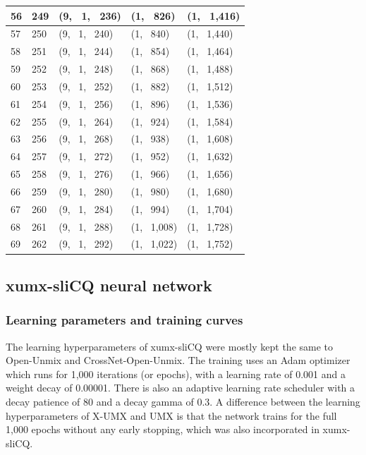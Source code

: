 \documentclass[report.tex]{subfiles}
\begin{document}
\begin{table}[ht]
\begin{tabular}{ |l|l|l|l|l| }
\hline
56 & 249 & (9, \ 1, \ 236) & (1, \ 826) & (1, \ 1,416) \\
\hline
57 & 250 & (9, \ 1, \ 240) & (1, \ 840) & (1, \ 1,440) \\
\hline
58 & 251 & (9, \ 1, \ 244) & (1, \ 854) & (1, \ 1,464) \\
\hline
59 & 252 & (9, \ 1, \ 248) & (1, \ 868) & (1, \ 1,488) \\
\hline
60 & 253 & (9, \ 1, \ 252) & (1, \ 882) & (1, \ 1,512) \\
\hline
61 & 254 & (9, \ 1, \ 256) & (1, \ 896) & (1, \ 1,536) \\
\hline
62 & 255 & (9, \ 1, \ 264) & (1, \ 924) & (1, \ 1,584) \\
\hline
63 & 256 & (9, \ 1, \ 268) & (1, \ 938) & (1, \ 1,608) \\
\hline
64 & 257 & (9, \ 1, \ 272) & (1, \ 952) & (1, \ 1,632) \\
\hline
65 & 258 & (9, \ 1, \ 276) & (1, \ 966) & (1, \ 1,656) \\
\hline
66 & 259 & (9, \ 1, \ 280) & (1, \ 980) & (1, \ 1,680) \\
\hline
67 & 260 & (9, \ 1, \ 284) & (1, \ 994) & (1, \ 1,704) \\
\hline
68 & 261 & (9, \ 1, \ 288) & (1, \ 1,008) & (1, \ 1,728) \\
\hline
69 & 262 & (9, \ 1, \ 292) & (1, \ 1,022) & (1, \ 1,752) \\
\hline
\end{tabular}
\end{table}

\newpagefill

\subsection{xumx-sliCQ neural network}

\subsubsection{Learning parameters and training curves}

The learning hyperparameters of xumx-sliCQ were mostly kept the same to Open-Unmix and CrossNet-Open-Unmix. The training uses an Adam optimizer which runs for 1,000 iterations (or epochs), with a learning rate of 0.001 and a weight decay of 0.00001. There is also an adaptive learning rate scheduler with a decay patience of 80 and a decay gamma of 0.3. A difference between the learning hyperparameters of X-UMX and UMX is that the network trains for the full 1,000 epochs without any early stopping, which was also incorporated in xumx-sliCQ.
\end{document}
